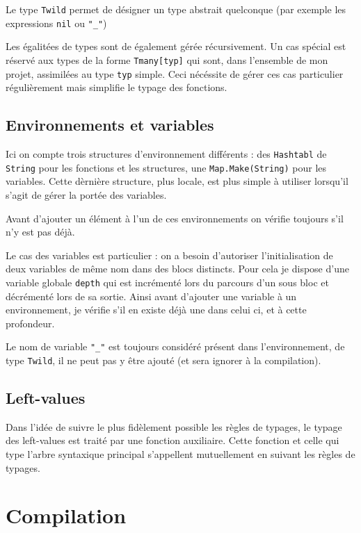 \documentclass[11pt,a4paper]{article}
\begin{document}
Le type \verb|Twild| permet de désigner un type abstrait quelconque (par exemple les expressions \verb|nil| ou \verb|"_"|)

Les égalitées de types sont de également gérée récursivement. Un cas spécial est réservé aux types de la forme \verb|Tmany[typ]| qui sont, dans l'ensemble de mon projet, assimilées au type \verb|typ| simple. Ceci nécéssite de gérer ces cas particulier régulièrement mais simplifie le typage des fonctions.

\subsection{Environnements et variables}

Ici on compte trois structures d'environnement différents : des \verb|Hashtabl| de \verb|String| pour les fonctions et les structures, une \verb|Map.Make(String)| pour les variables. Cette dèrnière structure, plus locale, est plus simple à utiliser lorsqu'il s'agit de gérer la portée des variables.

Avant d'ajouter un élément à l'un de ces environnements on vérifie toujours s'il n'y est pas déjà.

Le cas des variables est particulier : on a besoin d'autoriser l'initialisation de deux variables de même nom dans des blocs distincts. Pour cela je dispose d'une variable globale \verb|depth| qui est incrémenté lors du parcours d'un sous bloc et décrémenté lors de sa sortie. Ainsi avant d'ajouter une variable à un environnement, je vérifie s'il en existe déjà une dans celui ci, et à cette profondeur.

Le nom de variable \verb|"_"| est toujours considéré présent dans l'environnement, de type \verb|Twild|, il ne peut pas y être ajouté (et sera ignorer à la compilation).

\subsection{Left-values}

Dans l'idée de suivre le plus fidèlement possible les règles de typages, le typage des left-values est traité par une fonction auxiliaire. Cette fonction et celle qui type l'arbre syntaxique principal s'appellent mutuellement en suivant les règles de typages.

\section{Compilation}
\end{document}
